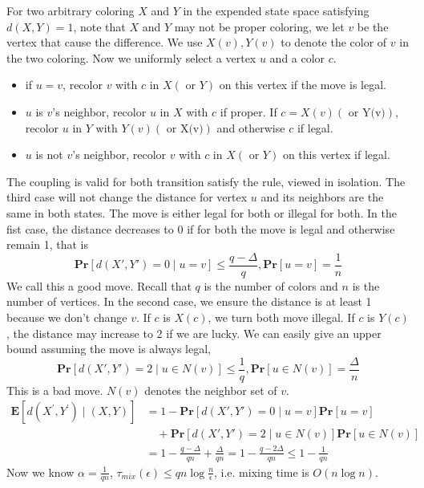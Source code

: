 \documentclass{article}
\theoremstyle{definition}
\begin{document}
\begin{enumerate}[(1)]
		\noindent For two arbitrary coloring $X$ and $Y$ in the expended state space satisfying $d\left(X, Y\right)=1$, note that $X$ and $Y$ may not be proper coloring, we let $v$ be the vertex that cause the difference. We use $X(v), Y(v)$ to denote the color of $v$ in the two coloring. Now we uniformly select a vertex $u$ and a color $c$. 
		\begin{itemize}
			\item if $u=v$, recolor $v$ with $c$ in $X(\text{ or }Y)$ on this vertex if the move is legal.
			\item $u$ is $v$'s neighbor, recolor $u$ in $X$ with $c$ if proper. If $c=X(v)(\text{ or Y(v)})$, recolor $u$ in $Y$ with $Y(v)(\text{ or X(v)})$ and otherwise $c$ if legal.
			\item $u$ is not $v$'s neighbor, recolor $v$ with $c$ in $X(\text{ or }Y)$ on this vertex if legal.
		\end{itemize}
		The coupling is valid for both transition satisfy the rule, viewed in isolation. The third case will not change the distance for vertex $u$ and its neighbors are the same in both states. The move is either legal for both or illegal for both. In the fist case, the distance decreases to 0 if for both the move is legal and otherwise remain 1, that is 
		\begin{equation}
			\mathbf{Pr}[d(X', Y')=0\mid u=v] \leq \frac{q-\Delta}{q}, \mathbf{Pr}[u=v] = \frac{1}{n}
		\end{equation}
		We call this a good move. Recall that $q$ is the number of colors and $n$ is the number of vertices. In the second case, we ensure the distance is at least 1 because we don't change $v$. If $c$ is $X(c)$, we turn both move illegal. If $c$ is $Y(c)$, the distance may increase to 2 if we are lucky. We can easily give an upper bound assuming the move is always legal,
		\begin{equation}
			\mathbf{Pr}[d(X', Y')=2\mid u \in N(v)] \leq \frac{1}{q}, \mathbf{Pr}[u \in N(v)] = \frac{\Delta}{n}
		\end{equation}
		This is a bad move. $N(v)$ denotes the neighbor set of $v$. 
		\begin{equation}
			\begin{aligned}
				\mathbf{E}\left[d\left(X^{\prime}, Y^{\prime}\right) \mid \left( X, Y \right) \right]&=1-\mathbf{Pr}[d(X', Y')=0\mid u=v] \mathbf{Pr}[u=v]\\
				&\quad+\mathbf{Pr}[d(X', Y')=2\mid u \in N(v)]\mathbf{Pr}[u \in N(v)]\\
				&=1-\frac{q-\Delta}{q n}+\frac{\Delta}{q n}=1-\frac{q-2 \Delta}{q n} \leq 1-\frac{1}{q n}
			\end{aligned}
		\end{equation}
		Now we know $\alpha=\frac{1}{qn}$, $\tau_{mix}(\epsilon) \leq qn\log\frac{n}{\epsilon}$, i.e. mixing time is $O(n\log n)$.
	\end{enumerate}
\end{document}
